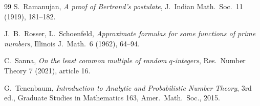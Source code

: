 \documentclass[11pt]{article}
\theoremstyle{remark}
\begin{document}
\begin{thebibliography}{99}
S.~Ramanujan, \emph{A proof of Bertrand's postulate}, J.\ Indian Math.\ Soc.\ 11 (1919), 181--182.

J.~B.~Rosser, L.~Schoenfeld, \emph{Approximate formulas for some functions of prime numbers}, Illinois J.\ Math.\ 6 (1962), 64--94.

C.~Sanna, \emph{On the least common multiple of random $q$-integers}, Res.\ Number Theory 7 (2021), article 16.

G.~Tenenbaum, \emph{Introduction to Analytic and Probabilistic Number Theory}, 3rd ed., Graduate Studies in Mathematics 163, Amer.\ Math.\ Soc., 2015.

\end{thebibliography}
\end{document}
